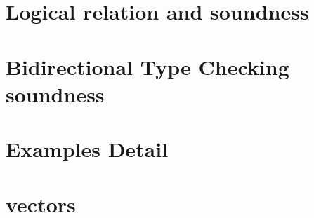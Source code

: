 \documentclass[a4paper,11pt]{article}
\theoremstyle{definition}
\begin{document}

\clearpage
\section{Logical relation and soundness}
\label{lg}




\clearpage



\clearpage
\section{Bidirectional Type Checking soundness}
%


\clearpage
\section{Examples Detail}


\clearpage
\section{vectors}


\newpage


\end{document}
